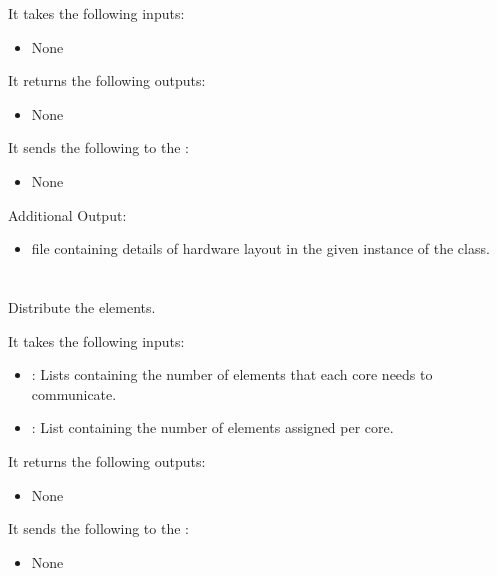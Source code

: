 It takes the following inputs:

\begin{itemize}
\item None
\end{itemize}

It returns the following outputs:

\begin{itemize}
\item None
\end{itemize}

It sends the following to the :

\begin{itemize}
\item None
\end{itemize}

Additional Output:
\begin{itemize}
\item {} file containing details of hardware layout in the given instance of the class.
\end{itemize}


\section{}
Distribute the elements.

It takes the following inputs:

\begin{itemize}
\item {}:  Lists containing the number of elements that each core needs to communicate. 
\item {}: List containing the number of elements assigned per core.
\end{itemize}

It returns the following outputs:

\begin{itemize}
\item None
\end{itemize}

It sends the following to the :

\begin{itemize}
\item None
\end{itemize}

